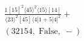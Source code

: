 \documentclass[varwidth, border=5pt]{standalone}
\begin{document}
\begin{my}
$\begin{gathered}
\scriptscriptstyle\frac{1[15]^2⟨45⟩^2⟨15⟩[14]}{⟨23⟩^2[45]⟨4|1+5|4]^2}+\\
\scriptscriptstyle(32154,\;\text{False},\;-)\phantom{+}
\end{gathered}$
\end{my}
\end{document}
